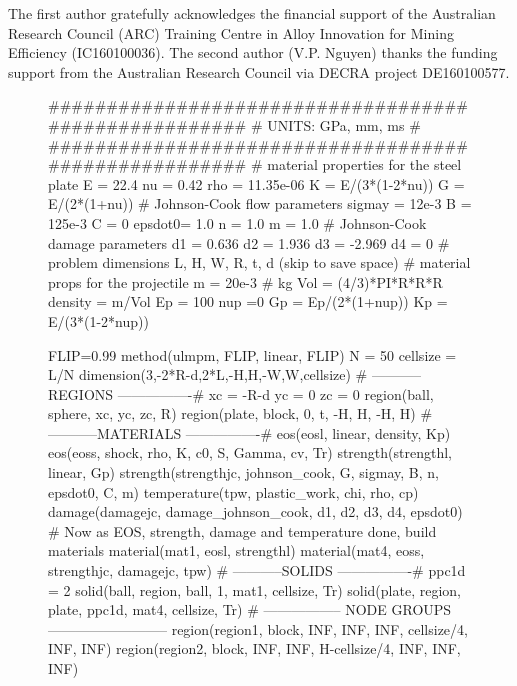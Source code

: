 \documentclass[authoryear,3p,times,preprint,review,fleqn]{elsarticle}
\numberwithin{equation}{section}
\theoremstyle{remark}
\begin{document}
The first  author gratefully acknowledges the financial support of the Australian Research Council (ARC) Training Centre in Alloy Innovation for Mining Efficiency (IC160100036).
 The second author (V.P. Nguyen) thanks the funding support from the Australian Research Council via DECRA project DE160100577. 

\begin{appendix}
%


\begin{figure}[!h]
  \begin{snippet}[caption={Input file for the plate penetration problem.},label={snippet_penetration},framerule=1pt,tabsize=3]
    #####################################################
    #               UNITS: GPa, mm, ms                  #
    #####################################################
    # material properties for the steel plate
    E   = 22.4
    nu  = 0.42
    rho = 11.35e-06
    K   = E/(3*(1-2*nu))
    G   = E/(2*(1+nu))
    # Johnson-Cook flow parameters
    sigmay = 12e-3
    B      = 125e-3
    C      = 0
    epsdot0= 1.0
    n      = 1.0
    m      = 1.0
    # Johnson-Cook damage parameters
    d1 = 0.636
    d2 = 1.936
    d3 = -2.969
    d4 = 0
    # problem dimensions
    L, H, W, R, t, d (skip to save space)
    # material props for the projectile 
    m = 20e-3 # kg
    Vol = (4/3)*PI*R*R*R
    density = m/Vol
    Ep = 100
    nup =0
    Gp = Ep/(2*(1+nup))
    Kp = E/(3*(1-2*nup))

    FLIP=0.99
    method(ulmpm, FLIP, linear, FLIP)
    N = 50
    cellsize = L/N
    dimension(3,-2*R-d,2*L,-H,H,-W,W,cellsize)
    # -----------REGIONS ----------------#
    xc = -R-d
    yc = 0 
    zc = 0 
    region(ball,  sphere, xc, yc, zc, R)
    region(plate, block, 0, t, -H, H, -H, H)
    # -----------MATERIALS ----------------#
    eos(eosl, linear, density, Kp)
    eos(eoss, shock,  rho, K, c0, S, Gamma, cv, Tr)
    strength(strengthl,  linear, Gp)
    strength(strengthjc, johnson_cook, G, sigmay, B, n, epsdot0, C, m)
    temperature(tpw, plastic_work, chi, rho, cp)
    damage(damagejc, damage_johnson_cook, d1, d2, d3, d4, epsdot0)
    # Now as EOS, strength, damage and temperature done, build materials
    material(mat1, eosl, strengthl)
    material(mat4, eoss, strengthjc, damagejc, tpw)
    # -----------SOLIDS ----------------#
    ppc1d = 2
    solid(ball,  region, ball,  1,     mat1, cellsize, Tr)
    solid(plate, region, plate, ppc1d, mat4, cellsize, Tr)
    # ----------------- NODE GROUPS --------------------------
    region(region1, block, INF, INF, INF, cellsize/4, INF, INF)
    region(region2, block, INF, INF, H-cellsize/4, INF, INF, INF)


\end{snippet}
\end{figure}
\end{appendix}
\end{document}
